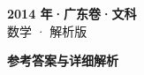 \documentclass[zihao=-4, a4paper]{ctexart}
\begin{document}
\begin{center}
  {\Large\bfseries 2014 年·广东卷·文科}\\[4pt]
  {\large 数学 · 解析版}
\end{center}
\medskip
{}

\clearpage
{}
\begin{center}{\Large\bfseries 参考答案与详细解析}\end{center}
\medskip

\end{document}
